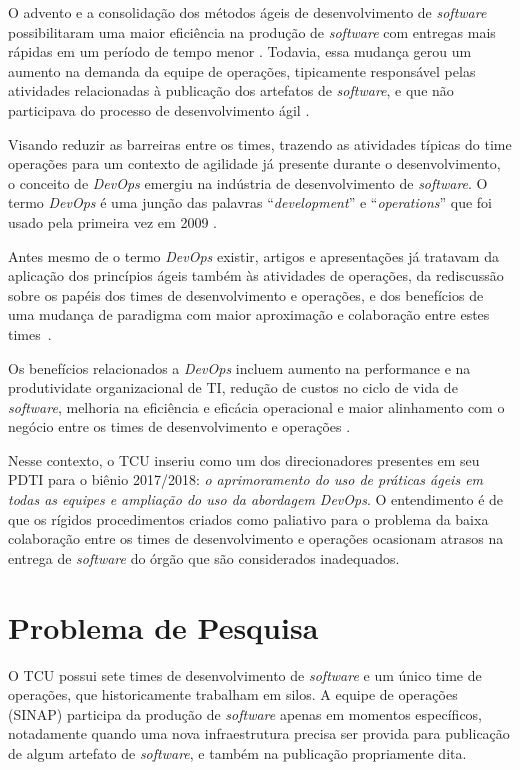 O advento e a consolidação dos métodos ágeis de desenvolvimento de
\textit{software} possibilitaram uma maior eficiência na produção de
\textit{software} com entregas mais rápidas em um período de tempo menor
\cite{agile_sw_dev}. Todavia, essa mudança gerou um aumento na demanda da equipe de
operações, tipicamente responsável pelas atividades relacionadas à
publicação dos artefatos de \textit{software}, e que não participava
do processo de desenvolvimento ágil \cite{humble2010continuous}.

Visando reduzir as barreiras entre os times, trazendo as atividades típicas
do time operações para um contexto de agilidade já presente durante o
desenvolvimento, o conceito de \textit{DevOps} emergiu na indústria de
desenvolvimento de \textit{software}. O termo \textit{DevOps} é uma
junção das palavras ``\textit{development}'' e ``\textit{operations}'' que
foi usado pela primeira vez em 2009 \cite{devops_for_developers}.

Antes mesmo de o termo \textit{DevOps} existir, artigos e apresentações
já tratavam da aplicação dos princípios ágeis também às atividades de operações,
da rediscussão sobre os papéis dos times de desenvolvimento e operações, e dos
benefícios de uma mudança de paradigma com maior aproximação e colaboração
entre estes times~\cite{devops_for_developers,flickr}.

Os benefícios relacionados a \textit{DevOps} incluem aumento na performance
e na produtividate organizacional de \acrshort{TI}, redução de custos no ciclo de vida
de \textit{software}, melhoria na eficiência e eficácia operacional e maior
alinhamento com o negócio entre os times de desenvolvimento e operações
\cite{characterizing_devops}.

Nesse contexto, o \acrfull{TCU} inseriu como um dos direcionadores presentes
em seu \acrfull{PDTI} para o biênio 2017/2018: \emph{o
aprimoramento do uso de práticas ágeis em todas as equipes e ampliação do uso da
abordagem DevOps}. O entendimento é de que os rígidos procedimentos criados
como paliativo para o problema da baixa colaboração entre os times de
desenvolvimento e operações ocasionam atrasos na entrega de \textit{software}
do órgão que são considerados inadequados.

\section{Problema de Pesquisa}%
O \acrshort{TCU} possui sete times de desenvolvimento de \textit{software} e um
único time de operações, que historicamente trabalham em silos.
A equipe de operações (\acrfull{SINAP}) participa da produção de
\textit{software} apenas em momentos específicos, notadamente quando uma nova
infraestrutura precisa ser provida para publicação de algum artefato de
\textit{software}, e também na publicação propriamente dita.

